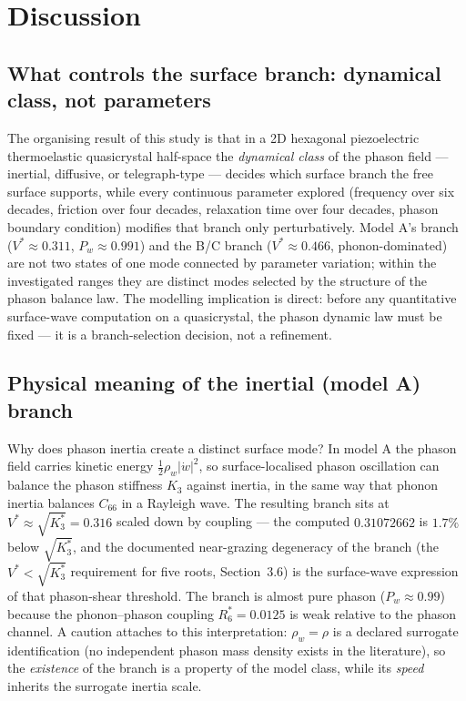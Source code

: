 \documentclass[11pt]{article}
\newcommand{\rw}{\rho_w}
\begin{document}
\section{Discussion}

\subsection{What controls the surface branch: dynamical class, not parameters}

The organising result of this study is that in a 2D hexagonal piezoelectric thermoelastic quasicrystal half-space the \emph{dynamical class} of the phason field --- inertial, diffusive, or telegraph-type --- decides which surface branch the free surface supports, while every continuous parameter explored (frequency over six decades, friction over four decades, relaxation time over four decades, phason boundary condition) modifies that branch only perturbatively. Model A's branch ($V^*\approx0.311$, $P_w\approx0.991$) and the B/C branch ($V^*\approx0.466$, phonon-dominated) are not two states of one mode connected by parameter variation; within the investigated ranges they are distinct modes selected by the structure of the phason balance law. The modelling implication is direct: before any quantitative surface-wave computation on a quasicrystal, the phason dynamic law must be fixed --- it is a branch-selection decision, not a refinement.

\subsection{Physical meaning of the inertial (model A) branch}

Why does phason inertia create a distinct surface mode? In model A the phason field carries kinetic energy $\tfrac12\rw|\dot w|^2$, so surface-localised phason oscillation can balance the phason stiffness $K_3$ against inertia, in the same way that phonon inertia balances $C_{66}$ in a Rayleigh wave. The resulting branch sits at $V^*\approx\sqrt{K_3^*}=0.316$ scaled down by coupling --- the computed $0.31072662$ is $1.7\%$ below $\sqrt{K_3^*}$, and the documented near-grazing degeneracy of the branch (the $V^*<\sqrt{K_3^*}$ requirement for five roots, Section~3.6) is the surface-wave expression of that phason-shear threshold. The branch is almost pure phason ($P_w\approx0.99$) because the phonon--phason coupling $R_6^*=0.0125$ is weak relative to the phason channel. A caution attaches to this interpretation: $\rw=\rho$ is a declared surrogate identification (no independent phason mass density exists in the literature), so the \emph{existence} of the branch is a property of the model class, while its \emph{speed} inherits the surrogate inertia scale.
\end{document}
